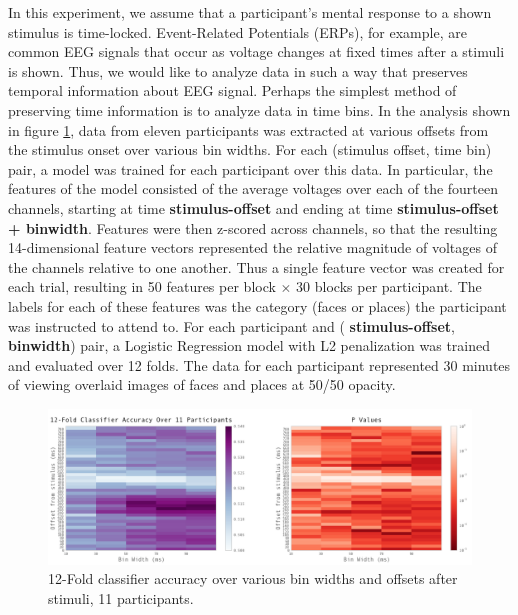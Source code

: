 \documentclass[11pt]{report}
\begin{document}
In this experiment, we assume that a participant's mental response to a shown stimulus is time-locked.  Event-Related Potentials (ERPs), for example, are common EEG signals that occur as voltage changes at fixed times after a stimuli is shown.  Thus, we would like to analyze data in such a way that preserves temporal information about EEG signal.  Perhaps the simplest method of preserving time information is to analyze data in time bins.  In the analysis shown in figure \ref{nfoldsimple}, data from eleven participants was extracted at various offsets from the stimulus onset over various bin widths.  For each (stimulus offset, time bin) pair, a model was trained for each participant over this data.  In particular, the features of the model consisted of the average voltages over each of the fourteen channels, starting at time \textbf{stimulus-offset} and ending at time \textbf{stimulus-offset + binwidth}.  Features were then z-scored across channels, so that the resulting 14-dimensional feature vectors represented the relative magnitude of voltages of the channels relative to one another.  Thus a single feature vector was created for each trial, resulting in 50 features per block $\times$ 30 blocks per participant.  The labels for each of these features was the category (faces or places) the participant was instructed to attend to. For each participant and (\textbf{ stimulus-offset}, \textbf{binwidth}) pair, a Logistic Regression model with L2 penalization was trained and evaluated over 12 folds.  The data for each participant represented 30 minutes of viewing overlaid images of faces and places at 50/50 opacity.

\begin{figure}[t]
\centerline{
\includegraphics[width=7in]{gridsearch_logreg_simple}
}
\caption{12-Fold classifier accuracy over various bin widths and offsets after stimuli, 11 participants.\label{nfoldsimple}}
\end{figure}
\end{document}
